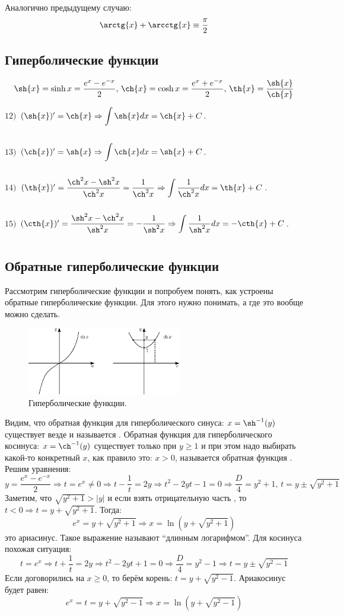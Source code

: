 \documentclass[12pt]{article}
\theoremstyle{definition}
\newcommand{\ddint}[2]{\displaystyle\int\limits_{#1}^{#2}}
\begin{document}
Аналогично предыдущему случаю:
$$
	\arctg{x} + \arcctg{x} \equiv \dfrac{\pi}{2}
$$

\subsection*{Гиперболические функции}
$$
	\sh{x} = \sinh{x} = \dfrac{e^x - e^{-x}}{2}, \, \ch{x} = \cosh{x} = \dfrac{e^x + e^{-x}}{2}, \, \th{x} = \dfrac{\sh{x}}{\ch{x}} 
$$
$12)$ $(\sh{x})' = \ch{x} \Rightarrow \ddint{}{}\sh{x}dx = \ch{x} + C$.

$13)$ $(\ch{x})' = \sh{x} \Rightarrow \ddint{}{}\ch{x}dx = \sh{x} + C$.

$14)$ $(\th{x})' = \dfrac{\ch^2{x} - \sh^2{x}}{\ch^2{x}} = \dfrac{1}{\ch^2{x}} \Rightarrow \ddint{}{}\dfrac{1}{\ch^2{x}}dx = \th{x} + C$.

$15)$ $(\cth{x})' = \dfrac{\sh^2{x} - \ch^2{x}}{\sh^2{x}} = -\dfrac{1}{\sh^2{x}} \Rightarrow \ddint{}{}\dfrac{1}{\sh^2{x}}dx = -\cth{x} + C$.

\subsection*{Обратные гиперболические функции}
Рассмотрим гиперболические функции и попробуем понять, как устроены обратные гиперболические функции. Для этого нужно понимать, а где это вообще можно сделать.
\begin{figure}[H]
	\centering
	\includegraphics[width=0.6\textwidth]{MA2S1_2.eps}
	\caption{Гиперболические функции.}
	\label{1_2}
\end{figure}
Видим, что обратная функция для гиперболического синуса: $x = \sh^{-1}{(y)}$ существует везде и называется . Обратная функция для гиперболического косинуса: $x = \ch^{-1}{(y)}$ существует только при $y \geq 1$ и при этом надо выбирать какой-то конкретный $x$, как правило это: $x > 0$, называется обратная функция . Решим уравнения:
$$
	y = \dfrac{e^x - e^{-x}}{2} \Rightarrow t = e^{x} \neq 0 \Rightarrow t - \dfrac{1}{t} = 2y \Rightarrow t^2 -2yt -1 = 0 \Rightarrow \dfrac{D}{4} = y^2 + 1, \, t = y \pm\sqrt{y^2 + 1}
$$
Заметим, что $\sqrt{y^2 + 1} > |y|$ и если взять отрицательную часть , то $t < 0 \Rightarrow t = y + \sqrt{y^2 + 1}$. Тогда:
$$
	e^x = y + \sqrt{y^2 + 1} \Rightarrow x = \ln{\left(y + \sqrt{y^2 + 1}\right)}
$$
это ариасинус. Такое выражение называют ``длинным логарифмом''. Для косинуса похожая ситуация:
$$
	t = e^x \Rightarrow t +\dfrac{1}{t} = 2y \Rightarrow t^2 - 2yt + 1 = 0 \Rightarrow \dfrac{D}{4} = y^2 - 1 \Rightarrow t = y \pm \sqrt{y^2 - 1} 
$$
Если договорились на $x \geq 0$, то берём корень: $t = y + \sqrt{y^2 -1}$. Ариакосинус будет равен:
$$
	e^x =t = y + \sqrt{y^2 -1} \Rightarrow x = \ln{\left(y + \sqrt{y^2 - 1}\right)}
$$
\end{document}
